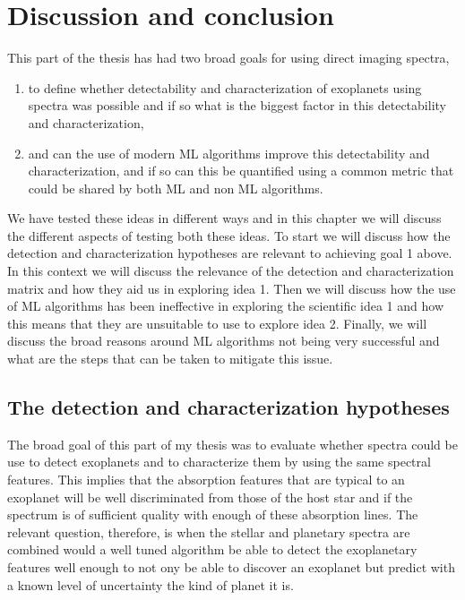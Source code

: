 \chapter{Discussion and conclusion}
This part of the thesis has had two broad goals for using direct imaging spectra,
\begin{enumerate}
    \item to define whether detectability and characterization of exoplanets using spectra was possible and if so what is the biggest factor in this detectability and characterization,
    \item and can the use of modern ML algorithms improve this detectability and characterization, and if so can this be quantified using a common metric that could be shared by both ML and non ML algorithms.
\end{enumerate}
We have tested these ideas in different ways and in this chapter we will discuss the different aspects of testing both these ideas.
To start we will discuss how the detection and characterization hypotheses are relevant to achieving goal 1 above.
In this context we will discuss the relevance of the detection and characterization matrix and how they aid us in exploring idea 1.
Then we will discuss how the use of ML algorithms has been ineffective in exploring the scientific idea 1 and how this means that they are unsuitable to use to explore idea 2.
Finally, we will discuss the broad reasons around ML algorithms not being very successful and what are the steps that can be taken to mitigate this issue.
\section{The detection and characterization hypotheses}
The broad goal of this part of my thesis was to evaluate whether spectra could be use to detect exoplanets and to characterize them by using the same spectral features.
This implies that the absorption features that are typical to an exoplanet will be well discriminated from those of the host star and if the spectrum is of sufficient quality with enough of these absorption lines.
The relevant question, therefore, is when the stellar and planetary spectra are combined would a well tuned algorithm be able to detect the exoplanetary features well enough to not ony be able to discover an exoplanet but predict with a known level of uncertainty the kind of planet it is.

